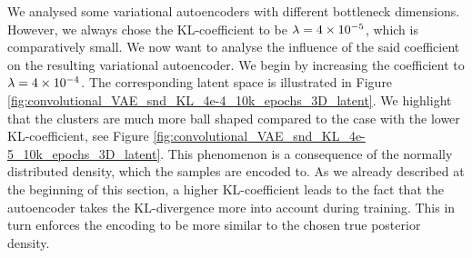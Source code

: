 We analysed some variational autoencoders with different bottleneck dimensions. However, we always chose the KL-coefficient to be $\lambda = \num{4e-5}$, which is comparatively small. We now want to analyse the influence of the said coefficient on the resulting variational autoencoder. We begin by increasing the coefficient to $\lambda = \num{4e-4}$. The corresponding latent space is illustrated in Figure \ref{fig:convolutional_VAE_snd_KL_4e-4_10k_epochs_3D_latent}. We highlight that the clusters are much more ball shaped compared to the case with the lower KL-coefficient, see Figure \ref{fig:convolutional_VAE_snd_KL_4e-5_10k_epochs_3D_latent}. This phenomenon is a consequence of the normally distributed density, which the samples are encoded to. As we already described at the beginning of this section, a higher KL-coefficient leads to the fact that the autoencoder takes the KL-divergence more into account during training. This in turn enforces the encoding to be more similar to the chosen true posterior density.

